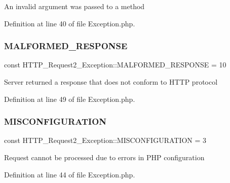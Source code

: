 An invalid argument was passed to a method 

Definition at line 40 of file Exception.\+php.

\hypertarget{classHTTP__Request2__Exception_a7c38b52fa885536cee022254f8984ac6}{}\label{classHTTP__Request2__Exception_a7c38b52fa885536cee022254f8984ac6} 
\subsubsection{\texorpdfstring{M\+A\+L\+F\+O\+R\+M\+E\+D\+\_\+\+R\+E\+S\+P\+O\+N\+SE}{MALFORMED\_RESPONSE}}
{\footnotesize\ttfamily const H\+T\+T\+P\+\_\+\+Request2\+\_\+\+Exception\+::\+M\+A\+L\+F\+O\+R\+M\+E\+D\+\_\+\+R\+E\+S\+P\+O\+N\+SE = 10}

Server returned a response that does not conform to H\+T\+TP protocol 

Definition at line 49 of file Exception.\+php.

\hypertarget{classHTTP__Request2__Exception_a85fe1066fb01f4686c158674ce561f26}{}\label{classHTTP__Request2__Exception_a85fe1066fb01f4686c158674ce561f26} 
\subsubsection{\texorpdfstring{M\+I\+S\+C\+O\+N\+F\+I\+G\+U\+R\+A\+T\+I\+ON}{MISCONFIGURATION}}
{\footnotesize\ttfamily const H\+T\+T\+P\+\_\+\+Request2\+\_\+\+Exception\+::\+M\+I\+S\+C\+O\+N\+F\+I\+G\+U\+R\+A\+T\+I\+ON = 3}

Request cannot be processed due to errors in P\+HP configuration 

Definition at line 44 of file Exception.\+php.

\hypertarget{classHTTP__Request2__Exception_af25f90a5d31c28cfc9da9ea7b3b8fbb8}{}\label{classHTTP__Request2__Exception_af25f90a5d31c28cfc9da9ea7b3b8fbb8} 
